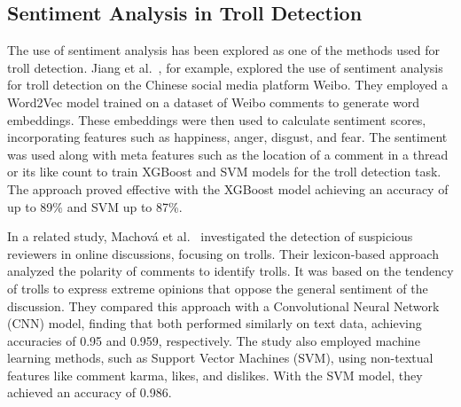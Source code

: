 \documentclass[twoside]{ctuthesis}
\theoremstyle{plain}
\theoremstyle{definition}
\theoremstyle{note}
\begin{document}
\subsection{Sentiment Analysis in Troll Detection}
The use of sentiment analysis has been explored as one of the methods used for troll detection. Jiang et al.~\cite{Jiang2021Sentiment}, for example, explored the use of sentiment analysis for troll detection on the Chinese social media platform Weibo. They employed a Word2Vec model trained on a dataset of Weibo comments to generate word embeddings. These embeddings were then used to calculate sentiment scores, incorporating features such as happiness, anger, disgust, and fear. The sentiment was used along with meta features such as the location of a comment in a thread or its like count to train XGBoost and SVM models for the troll detection task. The approach proved effective with the XGBoost model achieving an accuracy of up to 89\% and SVM up to 87\%.\par
In a related study, Machová et al.~\cite{Machova2022Comparison} investigated the detection of suspicious reviewers in online discussions, focusing on trolls. Their lexicon-based approach analyzed the polarity of comments to identify trolls. It was based on the tendency of trolls to express extreme opinions that oppose the general sentiment of the discussion. They compared this approach with a Convolutional Neural Network (CNN) model, finding that both performed similarly on text data, achieving accuracies of 0.95 and 0.959, respectively. The study also employed machine learning methods, such as Support Vector Machines (SVM), using non-textual features like comment karma, likes, and dislikes. With the SVM model, they achieved an accuracy of 0.986.\par 

\end{document}

